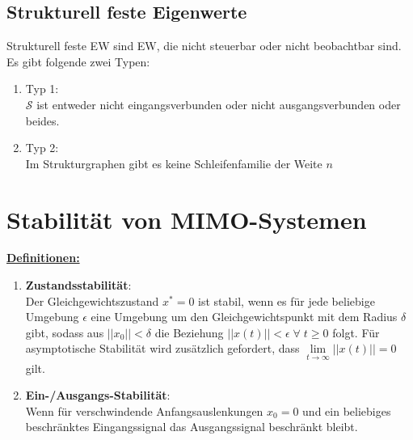 \documentclass[a4paper,twocolumn,10pt]{article}
\begin{document}
\subsection{Strukturell feste Eigenwerte}
Strukturell feste EW sind EW, die nicht steuerbar oder nicht beobachtbar sind. Es gibt folgende zwei Typen:
\begin{enumerate}[label=$\bullet$]
\item Typ 1:\\
$\mathcal{S}$ ist entweder nicht eingangsverbunden oder nicht ausgangsverbunden oder beides.
\item Typ 2:\\
Im Strukturgraphen gibt es keine Schleifenfamilie der Weite $n$
\end{enumerate}

\section{Stabilität von MIMO-Systemen}
\underline{\textbf{Definitionen:}}
\begin{enumerate}[label=$\bullet$]
\item \textbf{Zustandsstabilität}:\\
Der Gleichgewichtszustand $x^*=0$ ist stabil, wenn es für jede beliebige Umgebung $\epsilon$ eine Umgebung um den Gleichgewichtspunkt mit dem Radius $\delta$ gibt, sodass aus $||x_0||<\delta$ die Beziehung $||x(t)||<\epsilon\;\forall\; t\geq 0$ folgt. Für asymptotische Stabilität wird zusätzlich gefordert, dass $\lim\limits_{t\rightarrow\infty}||x(t)||=0$ gilt.
\item \textbf{Ein-/Ausgangs-Stabilität}:\\
Wenn für verschwindende Anfangsauslenkungen $x_0=0$ und ein beliebiges beschränktes Eingangssignal das Ausgangssignal beschränkt bleibt.
\end{enumerate}
\end{document}
